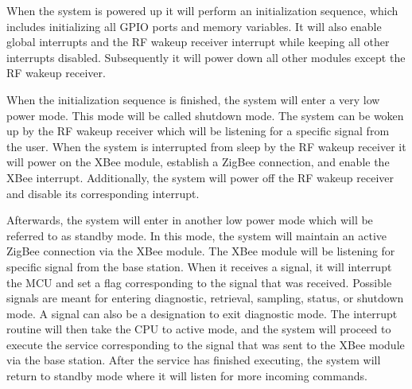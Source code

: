 When the system is powered up it will perform an initialization sequence, which includes initializing all GPIO ports and memory variables. It will also enable global interrupts and the RF wakeup receiver interrupt while keeping all other interrupts disabled. Subsequently it will power down all other modules except the RF wakeup receiver.

When the initialization sequence is finished, the system will enter a very low power mode. This mode will be called shutdown mode. The system can be woken up by the RF wakeup receiver which will be listening for a specific signal from the user. When the system is interrupted from sleep by the RF wakeup receiver it will power on the XBee module, establish a ZigBee connection, and enable the XBee interrupt. Additionally, the system will power off the RF wakeup receiver and disable its corresponding interrupt.

Afterwards, the system will enter in another low power mode which will be referred to as standby mode. In this mode, the system will maintain an active ZigBee connection via the XBee module. The XBee module will be listening for specific signal from the base station. When it receives a signal, it will interrupt the MCU and set a flag corresponding to the signal that was received. Possible signals are meant for entering diagnostic, retrieval, sampling, status, or shutdown mode. A signal can also be a designation to exit diagnostic mode. The interrupt routine will then take the CPU to active mode, and the system will proceed to execute the service corresponding to the signal that was sent to the XBee module via the base station. After the service has finished executing, the system will return to standby mode where it will listen for more incoming commands.

